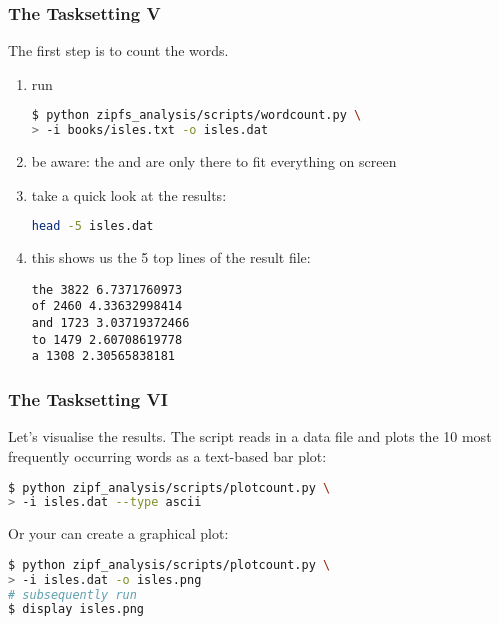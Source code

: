 \begin{frame}[fragile]
  \frametitle{The Tasksetting V}
  The first step is to count the words.\newline
  \begin{enumerate}
   \item run \begin{lstlisting}[language=Bash, style=Shell, basicstyle=\footnotesize] 
$ python zipfs_analysis/scripts/wordcount.py \
> -i books/isles.txt -o isles.dat           
             \end{lstlisting}
  \item be aware: the \altverb{\\} and \altverb{>} are only there to fit everything on screen
  \item take a quick look at the results:
        \begin{lstlisting}[language=Bash, style=Shell] 
head -5 isles.dat
        \end{lstlisting}
  \item this shows us the 5 top lines of the result file:
  \begin{lstlisting}[style=Plain]
the 3822 6.7371760973
of 2460 4.33632998414
and 1723 3.03719372466
to 1479 2.60708619778
a 1308 2.30565838181
  \end{lstlisting}
   \end{enumerate}
\end{frame}

\begin{frame}[fragile]
  \frametitle{The Tasksetting VI}
  Let’s visualise the results. The script  reads in a data file and plots the 10 most frequently occurring words as a text-based bar plot:
  \begin{lstlisting}[language=Bash, style=Shell] 
$ python zipf_analysis/scripts/plotcount.py \
> -i isles.dat --type ascii
  \end{lstlisting}
  \pause
  Or your can create a graphical plot:
  \begin{lstlisting}[language=Bash, style=Shell] 
$ python zipf_analysis/scripts/plotcount.py \
> -i isles.dat -o isles.png
# subsequently run
$ display isles.png
  \end{lstlisting}
\end{frame}

